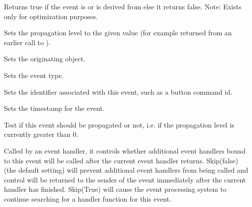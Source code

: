 \label{wxeventiscommandevent}


Returns true if the event is or is derived from
 else it returns false.
Note: Exists only for optimization purposes.


\label{wxeventresumepropagation}


Sets the propagation level to the given value (for example returned from an
earlier call to ).


\label{wxeventseteventobject}


Sets the originating object.

\label{wxeventseteventtype}


Sets the event type.

\label{wxeventsetid}


Sets the identifier associated with this event, such as a button command id.

\label{wxeventsettimestamp}


Sets the timestamp for the event.

\label{wxeventshouldpropagate}


Test if this event should be propagated or not, i.e. if the propagation level
is currently greater than $0$.

\label{wxeventskip}


Called by an event handler, it controls whether additional event
handlers bound to this event will be called after the current event
handler returns.  Skip(false) (the default setting) will prevent
additional event handlers from being called and control will be
returned to the sender of the event immediately after the current
handler has finished.  Skip(True) will cause the event processing
system to continue searching for a handler function for this event.


